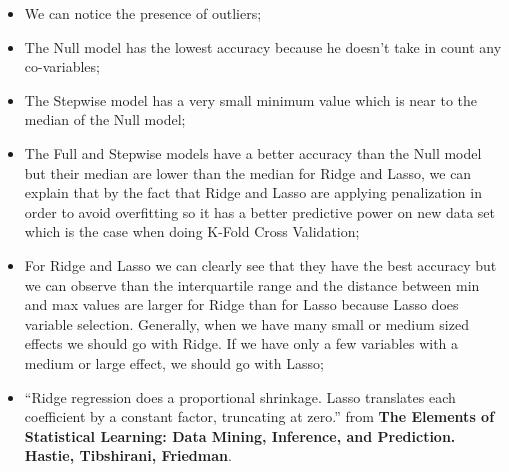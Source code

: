 \documentclass[
]{article}
\begin{document}
\begin{itemize}
\item
  We can notice the presence of outliers;
\item
  The Null model has the lowest accuracy because he doesn't take in
  count any co-variables;
\item
  The Stepwise model has a very small minimum value which is near to the
  median of the Null model;
\item
  The Full and Stepwise models have a better accuracy than the Null
  model but their median are lower than the median for Ridge and Lasso,
  we can explain that by the fact that Ridge and Lasso are applying
  penalization in order to avoid overfitting so it has a better
  predictive power on new data set which is the case when doing K-Fold
  Cross Validation;
\item
  For Ridge and Lasso we can clearly see that they have the best
  accuracy but we can observe than the interquartile range and the
  distance between min and max values are larger for Ridge than for
  Lasso because Lasso does variable selection. Generally, when we have
  many small or medium sized effects we should go with Ridge. If we have
  only a few variables with a medium or large effect, we should go with
  Lasso;
\item
  ``Ridge regression does a proportional shrinkage. Lasso translates
  each coefficient by a constant factor, truncating at zero.'' from
  \textbf{The Elements of Statistical Learning: Data Mining, Inference,
  and Prediction. Hastie, Tibshirani, Friedman}.
\end{itemize}
\end{document}
